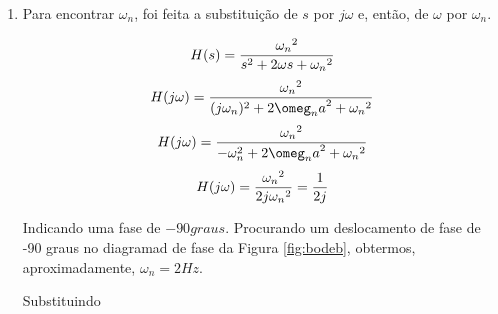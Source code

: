 \documentclass[12pt,letterpaper]{article}
\begin{document}
\begin{enumerate}[label=(\alph*)]
    \item
    Para encontrar $\omega_n$, foi feita a substituição de $s$ por $j\omega$ e, então, de $\omega$ por $\omega_n$.
    
    $$
    H(s) = {{\omega_n}^2 \over {s^2 + 2\omega s + {\omega_n}^2}     }
    $$
    $$
    H(j\omega) = {{\omega_n}^2 \over {(j\omega_n)^2 + 2{\omeg_na}^2  + {\omega_n}^2}     }
    $$
    $$
    H(j\omega) = {{\omega_n}^2 \over {-\omega_n^2 + 2{\omeg_na}^2  + {\omega_n}^2}     }
    $$
    $$
    H(j\omega) = {{\omega_n}^2 \over {2j{\omega_n}^2} } = {1 \over 2j}
    $$
    
    Indicando uma fase de $-90 graus$. Procurando um deslocamento de fase de -90 graus no diagramad de fase da Figura \ref{fig:bodeb}, obtermos, aproximadamente, $\omega_n = 2Hz$.
    
    Substituindo 

    
\end{enumerate}





\end{document}
